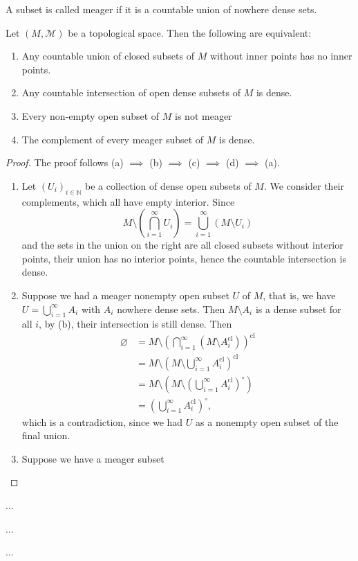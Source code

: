 \documentclass[prb,12pt]{revtex4-2}
\theoremstyle{definition}
\theoremstyle{definition}
\theoremstyle{definition}
\newenvironment{parts}{\begin{enumerate}[label=(\alph*)]}{\end{enumerate}}
\newcommand{\N}{\mathbb{N}}
\begin{document}
\begin{Definition}[Meager]
	A subset is called meager if it is a countable union of nowhere dense sets.
\end{Definition}
\begin{Theorem}
	Let $(M, \mathcal{M})$ be a topological space. Then the following are equivalent:
	\begin{parts}
		\item Any countable union of closed subsets of $M$ without inner points has no inner points.
		\item Any countable intersection of open dense subsets of $M$ is dense.
		\item Every non-empty open subset of $M$ is not meager
		\item The complement of every meager subset of $M$ is dense.
	\end{parts}
\end{Theorem}
\begin{proof}
	The proof follows (a) $\implies$ (b) $\implies$ (c) $\implies$ (d) $\implies$ (a).
	\begin{enumerate}
		\item Let $(U_i)_{i\in \N}$ be a collection of dense open subsets of $M$. We consider their complements, which all have empty interior. Since
		\[M \setminus \left(\bigcap_{i=1}^\infty U_i\right)=\bigcup_{i=1}^\infty \left(M \setminus U_i\right)\]
		and the sets in the union on the right are all closed subsets without interior points, their union has no interior points, hence the countable intersection is dense.
		\item Suppose we had a meager nonempty open subset $U$ of $M$, that is, we have $U=\bigcup_{i=1}^\infty A_i$ with $A_i$ nowhere dense sets. Then $M \setminus A_i$ is a dense subset for all $i$, by (b), their intersection is still dense. Then
		\begin{align*}
			\varnothing &= M \setminus \left(\bigcap_{i=1}^\infty (M \setminus A_i^\text{cl})\right)^\text{cl}\\
			&= M \setminus \left(M \setminus \bigcup_{i=1}^\infty A_i^\text{cl}\right)^\text{cl}\\
			&= M \setminus \left(M \setminus\left(\bigcup_{i=1}^\infty A_i^\text{cl}\right)^\circ\right)\\
			&=\left(\bigcup_{i=1}^\infty A_i^\text{cl}\right)^\circ,
		\end{align*}
	which is a contradiction, since we had $U$ as a nonempty open subset of the final union. 
	\item Suppose we have a meager subset
	\end{enumerate}
\end{proof}
	\begin{Definition}
		...
	\end{Definition}
	\begin{Theorem}[Baire I]
		...
	\end{Theorem}
	\begin{Theorem}[Baire II]
		...
	\end{Theorem}
\end{document}
